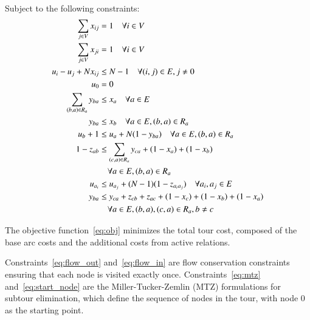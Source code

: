 \documentclass[twocolumn]{article} %
\begin{document}
Subject to the following constraints:
\begin{subequations}
\begin{align}
    \sum_{j \in V} x_{ij} &= 1 \quad \forall i \in V \label{eq:flow_out} \\
    \sum_{j \in V} x_{ji} &= 1 \quad \forall i \in V \label{eq:flow_in} \\
    u_i - u_j + N x_{ij} &\leq N-1 \quad \forall (i,j) \in E, j \neq 0 \label{eq:mtz} \\
    u_0 &= 0 \label{eq:start_node} \\
    \sum_{(b,a) \in R_a} y_{ba} &\leq x_a \quad \forall a \in E \label{eq:rel_active_1} \\
    y_{ba} &\leq x_b \quad \forall a \in E, (b,a) \in R_a \label{eq:rel_active_2} \\
    u_b + 1 &\leq u_a + N(1-y_{ba}) \quad \forall a \in E, (b,a) \in R_a \label{eq:rel_precedence} \\
    1 - z_{ab} &\leq \sum_{(c,a) \in R_a} y_{ca} + (1 - x_a) + (1 - x_b) \notag \\
    &\quad \forall a \in E, (b,a) \in R_a \label{eq:rel_active_3} \\
    u_{a_i} &\leq u_{a_j} + (N-1)(1-z_{a_ia_j}) \quad \forall a_i, a_j \in E \label{eq:z_precedence} \\
    y_{ba} &\leq y_{ca} + z_{cb} + z_{ac} + (1-x_c) + (1-x_b) + (1-x_a) \notag \\
    &\quad \forall a \in E, (b,a),(c,a) \in R_a, b \neq c \label{eq:rel_last_trigger}
\end{align}
\end{subequations}

\normalsize

The objective function~\eqref{eq:obj} minimizes the total tour cost, composed of the base arc costs and the additional costs from active relations.

Constraints~\eqref{eq:flow_out} and~\eqref{eq:flow_in} are flow conservation constraints ensuring that each node is visited exactly once.
Constraints~\eqref{eq:mtz} and~\eqref{eq:start_node} are the Miller-Tucker-Zemlin (MTZ) formulations for subtour elimination, which define the sequence of nodes in the tour, with node 0 as the starting point.
\end{document}
